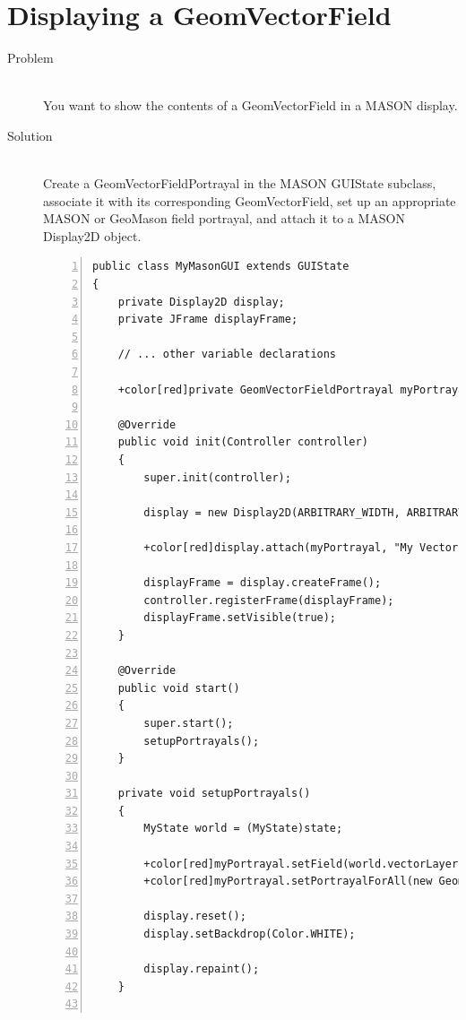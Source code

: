 \documentclass[twoside,10pt]{book}
\newcommand\code[1]{\textsf{#1}}
\begin{document}
\section{Displaying a \code{GeomVectorField}}
\label{sec:displayingGeomVectorField}

\begin{description}
\item[Problem]~\\
You want to show the contents of a \code{GeomVectorField} in a
MASON display.

\item[Solution]~\\
Create a \code{GeomVectorFieldPortrayal} in the MASON \code{GUIState}
subclass, associate it with its corresponding \code{GeomVectorField},
set up an appropriate MASON or GeoMason field portrayal, and attach it
to a MASON \code{Display2D} object.

\begin{Verbatim}[frame=lines,framesep=5mm,numbers=left,commandchars=+\[\]]
public class MyMasonGUI extends GUIState
{
    private Display2D display;
    private JFrame displayFrame;

    // ... other variable declarations

    +color[red]private GeomVectorFieldPortrayal myPortrayal = new GeomVectorFieldPortrayal();

    @Override
    public void init(Controller controller)
    {
        super.init(controller);

        display = new Display2D(ARBITRARY_WIDTH, ARBITRARY_HEIGHT, this);

        +color[red]display.attach(myPortrayal, "My Vector Layer");

        displayFrame = display.createFrame();
        controller.registerFrame(displayFrame);
        displayFrame.setVisible(true);
    }

    @Override
    public void start()
    {
        super.start();
        setupPortrayals();
    }

    private void setupPortrayals()
    {
        MyState world = (MyState)state;

        +color[red]myPortrayal.setField(world.vectorLayer);
        +color[red]myPortrayal.setPortrayalForAll(new GeomPortrayal(Color.CYAN, true));+label[ex:trueforfill]

        display.reset();
        display.setBackdrop(Color.WHITE);

        display.repaint();
    }


\end{Verbatim}
\end{description}
\end{document}
